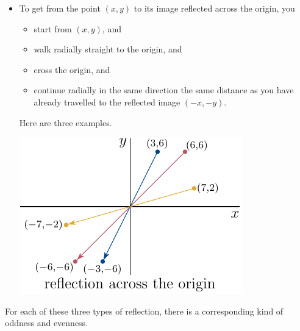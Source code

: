 \begin{itemize}
\begin{efig}
\begin{center}
    \end{center}
    \end{efig}
\item
 To get from the
     point $(x,y)$ to its image reflected across the origin, you
     \begin{itemize}
       \item start from $(x,y)$, and
       \item walk radially straight to the origin, and
       \item cross the origin, and
       \item continue radially in the same direction the same distance 
               as you have already travelled to the reflected image $(-x,-y)$. 
     \end{itemize}
     Here are three examples.
    \begin{efig}
    \begin{center}
        \includegraphics{refl2dXY.pdf}
    \end{center}
    \end{efig}
\end{itemize}

For each of these three types of reflection, there is a corresponding kind of 
oddness and evenness.

